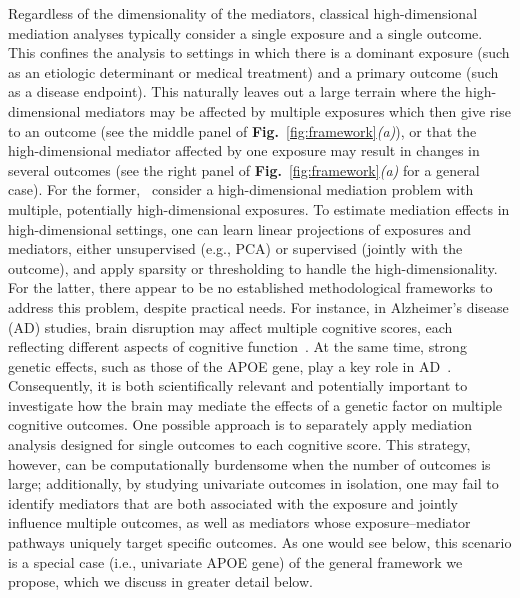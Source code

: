 \documentclass[
  12pt]{article}
\begin{document}
Regardless of the dimensionality of the mediators, classical high-dimensional mediation analyses typically consider a single exposure and a single outcome. This confines the analysis to settings in which there is a dominant exposure (such as an etiologic determinant or medical treatment) and a primary outcome (such as a disease endpoint). This naturally leaves out a large terrain where the high-dimensional mediators may be affected by multiple exposures which then give rise to an outcome (see the middle panel of \textbf{Fig.}~\ref{fig:framework}\textit{(a)}), or that the high-dimensional mediator affected by one exposure may result in changes in several outcomes (see the right panel of \textbf{Fig.}~\ref{fig:framework}\textit{(a)} for a general case). For the former,~\citep{zhao2022multimodal, zhao2024mediation} consider a high-dimensional mediation problem with multiple, potentially high-dimensional exposures. To estimate mediation effects in high-dimensional settings, one can learn linear projections of exposures and mediators, either unsupervised (e.g., PCA) or supervised (jointly with the outcome), and apply sparsity or thresholding to handle the high-dimensionality. For the latter, there appear to be no established methodological frameworks to address this problem, despite practical needs. For instance, in Alzheimer's disease (AD) studies, brain disruption may affect multiple cognitive scores, each reflecting different aspects of cognitive function~\citep{vu2025residual, Diaz2025OPTIMUS}. At the same time, strong genetic effects, such as those of the APOE gene, play a key role in AD~\citep{sienski2021apoe4, Diaz2025OPTIMUS}. Consequently, it is both scientifically relevant and potentially important to investigate how the brain may mediate the effects of a genetic factor on multiple cognitive outcomes. One possible approach is to separately apply mediation analysis designed for single outcomes to each cognitive score. This strategy, however, can be computationally burdensome when the number of outcomes is large; additionally, by studying univariate outcomes in isolation, one may fail to identify mediators that are both associated with the exposure and jointly influence multiple outcomes, as well as mediators whose exposure–mediator pathways uniquely target specific outcomes. As one would see below, this scenario is a special case (i.e., univariate APOE gene) of the general framework we propose, which we discuss in greater detail below.
\end{document}
